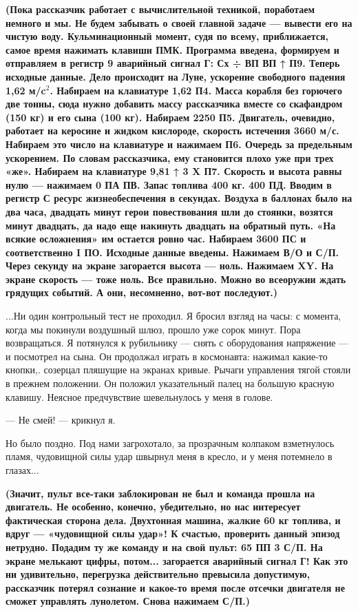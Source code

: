 \documentclass[11pt,a4paper,oneside]{article}
\begin{document}
\textbf{
(Пока рассказчик работает с вычислительной техникой, поработаем немного и мы. Не будем забывать о своей главной задаче — вывести его на чистую воду. Кульминационный момент, судя по всему, приближается, самое время нажимать клавиши ПМК. Программа введена, формируем и отправляем в регистр 9 аварийный сигнал Г: Сх ÷ ВП ВП ↑ П9. Теперь исходные данные. Дело происходит на Луне, ускорение свободного падения 1,62 м/c$^{2}$. Набираем на клавиатуре 1,62 П4. Масса корабля без горючего две тонны, сюда нужно добавить массу рассказчика вместе со скафандром (150 кг) и его сына (100 кг). Набираем 2250 П5. Двигатель, очевидно, работает на керосине и жидком кислороде, скорость истечения 3660 м/с. Набираем это число на клавиатуре и нажимаем П6. Очередь за предельным ускорением. По словам рассказчика, ему становится плохо уже при трех «же». Набираем на клавиатуре 9,81 ↑ 3 X П7. Скорость и высота равны нулю — нажимаем 0 ПА ПВ. Запас топлива 400 кг. 400 ПД. Вводим в регистр С ресурс жизнеобеспечения в секундах. Воздуха в баллонах было на два часа, двадцать минут герои повествования шли до стоянки, возятся минут двадцать, да надо еще накинуть двадцать на обратный путь. «На всякие осложнения» им остается ровно час. Набираем 3600 ПС и соответственно I ПО. Исходные данные введены. Нажимаем В/О и С/П. Через секунду на экране загорается высота — ноль. Нажимаем XY. На экране скорость — тоже ноль. Все правильно. Можно во всеоружии ждать грядущих событий. А они, несомненно, вот-вот последуют.)
}

...Ни один контрольный тест не проходил. Я бросил взгляд на часы: с момента, когда мы покинули воздушный шлюз, прошло уже сорок минут. Пора возвращаться. Я потянулся к рубильнику — снять с оборудования напряжение — и посмотрел на сына. Он продолжал играть в космонавта: нажимал какие-то кнопки,. созерцал пляшущие на экранах кривые. Рычаги управления тягой стояли в прежнем положении. Он положил указательный палец на большую красную клавишу. Неясное предчувствие шевельнулось у меня в голове.

— Не смей! — крикнул я.

Но было поздно. Под нами загрохотало, за прозрачным колпаком взметнулось пламя, чудовищной силы удар швырнул меня в кресло, и у меня потемнело в глазах...

\textbf{
(Значит, пульт все-таки заблокирован не был и команда прошла на двигатель. Не особенно, конечно, убедительно, но нас интересует фактическая сторона дела. Двухтонная машина, жалкие 60 кг топлива, и вдруг — «чудовищной силы удар»! К счастью, проверить данный эпизод нетрудно. Подадим ту же команду и на свой пульт: 65 ПП 3 С/П. На экране мелькают цифры, потом... загорается аварийный сигнал Г! Как это ни удивительно, перегрузка действительно превысила допустимую, рассказчик потерял сознание и какое-то время после отсечки двигателя не сможет управлять лунолетом. Снова нажимаем С/П.)
}
\end{document}
